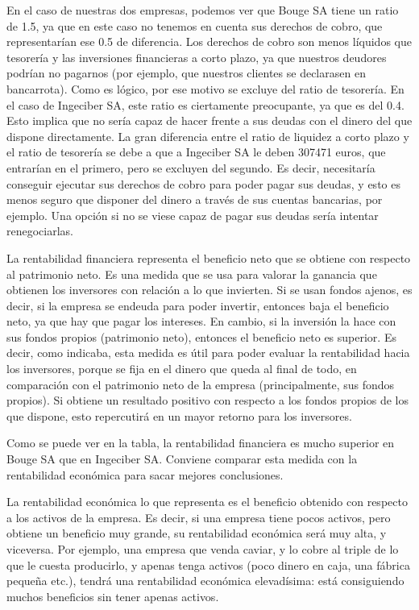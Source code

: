 \documentclass[a4paper]{article}
\begin{document}
En el caso de nuestras dos empresas, podemos ver que Bouge SA tiene un ratio de 1.5, ya que en este caso no tenemos en cuenta sus derechos de cobro, que representarían ese 0.5 de diferencia. Los derechos de cobro son menos líquidos que tesorería y las inversiones financieras a corto plazo, ya que nuestros deudores podrían no pagarnos (por ejemplo, que nuestros clientes se declarasen en bancarrota). Como es lógico, por ese motivo se excluye del ratio de tesorería. En el caso de Ingeciber SA, este ratio es ciertamente preocupante, ya que es del 0.4. Esto implica que no sería capaz de hacer frente a sus deudas con el dinero del que dispone directamente. La gran diferencia entre el ratio de liquidez a corto plazo y el ratio de tesorería se debe a que a Ingeciber SA le deben 307471 euros, que entrarían en el primero, pero se excluyen del segundo. Es decir, necesitaría conseguir ejecutar sus derechos de cobro para poder pagar sus deudas, y esto es menos seguro que disponer del dinero a través de sus cuentas bancarias, por ejemplo. Una opción si no se viese capaz de pagar sus deudas sería intentar renegociarlas.

La rentabilidad financiera representa el beneficio neto que se obtiene con respecto al patrimonio neto. Es una medida que se usa para valorar la ganancia que obtienen los inversores con relación a lo que invierten. Si se usan fondos ajenos, es decir, si la empresa se endeuda para poder invertir, entonces baja el beneficio neto, ya que hay que pagar los intereses. En cambio, si la inversión la hace con sus fondos propios (patrimonio neto), entonces el beneficio neto es superior. Es decir, como indicaba, esta medida es útil para poder evaluar la rentabilidad hacia los inversores, porque se fija en el dinero que queda al final de todo, en comparación con el patrimonio neto de la empresa (principalmente, sus fondos propios). Si obtiene un resultado positivo con respecto a los fondos propios de los que dispone, esto repercutirá en un mayor retorno para los inversores.

Como se puede ver en la tabla, la rentabilidad financiera es mucho superior en Bouge SA que en Ingeciber SA. Conviene comparar esta medida con la rentabilidad económica para sacar mejores conclusiones.

La rentabilidad económica lo que representa es el beneficio obtenido con respecto a los activos de la empresa. Es decir, si una empresa tiene pocos activos, pero obtiene un beneficio muy grande, su rentabilidad económica será muy alta, y viceversa. Por ejemplo, una empresa que venda caviar, y lo cobre al triple de lo que le cuesta producirlo, y apenas tenga activos (poco dinero en caja, una fábrica pequeña etc.), tendrá una rentabilidad económica elevadísima: está consiguiendo muchos beneficios sin tener apenas activos.
\end{document}
